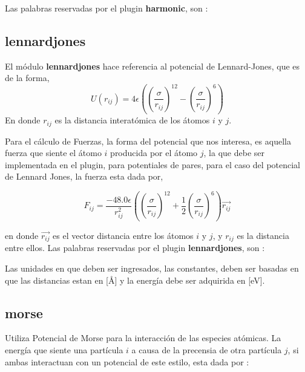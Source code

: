 Las palabras reservadas por el plugin \textbf{harmonic}, son :


\subsection{lennardjones}
El m\'odulo \textbf{lennardjones} hace referencia al potencial de Lennard-Jones, que es de la forma,
$$U(r_{ij}) = 4\epsilon\left(\left(\frac{\sigma}{r_{ij}}\right)^{12}-\left(\frac{\sigma}{r_{ij}}\right)^6\right)$$
En donde $r_{ij}$ es la distancia interat\'omica de los \'atomos $i$ y $j$. 

Para el c\'alculo de Fuerzas, la forma del potencial que nos interesa, es aquella fuerza que siente el \'atomo $i$ producida por el \'atomo $j$, la que debe ser implementada en el plugin, para potentiales de pares, para el caso del potencial de Lennard Jones, la fuerza esta dada por,

$$F_{ij} = \frac{-48.0\epsilon}{r_{ij}^2}\left( \left(\frac{\sigma}{r_{ij}}\right)^{12} + \frac{1}{2}\left(\frac{\sigma}{r_{ij}}\right)^6 \right) \vec{r_{ij}}$$

en donde $\vec{r_{ij}}$ es el vector distancia entre los \'atomos $i$ y $j$, y $r_{ij}$ es la distancia entre ellos. 
Las palabras reservadas por el plugin \textbf{lennardjones}, son :


Las unidades en que deben ser ingresados, las constantes, deben ser basadas en que las distancias estan en [\AA] y la energ\'ia debe ser adquirida en [eV].

\subsection{morse}
Utiliza Potencial de Morse para la interacci\'on de las especies at\'omicas. La energ\'ia que siente una part\'icula $i$ a causa de la precensia de otra part\'icula $j$, si ambas interactuan con un potencial de este estilo, esta dada por :

